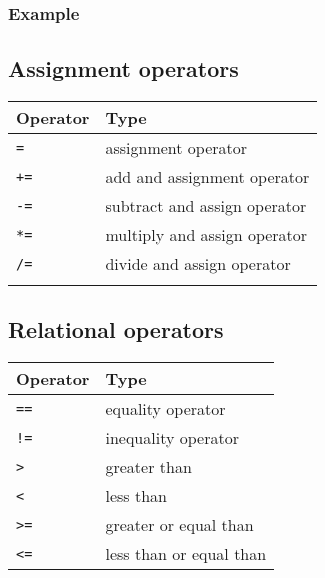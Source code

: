 \subsubsection{Example}

\subsection{Assignment operators}
\begin{center}
    \begin{tabular}{ |p{5cm}|p{7cm}| }
        \hline
            Operator & Type \\
        \hline
           \texttt{=} & assignment operator \\ 
           \texttt{+=} & add and assignment operator \\ 
           \texttt{-=} & subtract and assign operator \\ 
           \texttt{*=} & multiply and assign operator \\ 
           \texttt{/=} & divide and assign operator \\ 
           \texttt{%
        \hline
    \end{tabular}
\end{center}

\subsection{Relational operators}
\begin{center}
    \begin{tabular}{ |p{5cm}|p{7cm}| }
        \hline
            Operator & Type \\
        \hline
           \texttt{==} & equality operator \\ 
           \texttt{!=} & inequality operator \\ 
           \texttt{>} & greater than \\ 
           \texttt{<} & less than \\ 
           \texttt{>=} & greater or equal than \\ 
           \texttt{<=} & less than or equal than \\ 
        \hline
    \end{tabular}
\end{center}

